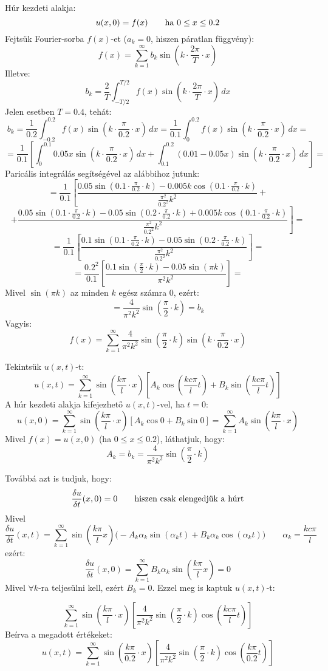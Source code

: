 \documentclass[12pt]{article}
\begin{document}
Húr kezdeti alakja:
\[u(x, 0) = f(x) \qquad \hbox{ha $0 \leq x \leq 0.2$}\]
Fejtsük Fourier-sorba $f(x)$-et ($a_k = 0$, hiszen páratlan függvény):
\[f(x) = \sum_{k=1}^{\infty} b_k \sin\left(k\cdot\frac{2\pi}{T}\cdot x\right)\]
Illetve:
\[b_k = \frac{2}{T} \int_{-T/2}^{T/2} f(x) \sin\left(k\cdot\frac{2\pi}{T}\cdot x\right)\, dx\]
Jelen esetben $T=0.4$, tehát:
\[b_k = \frac{1}{0.2} \int_{-0.2}^{0.2} f(x) \sin\left(k\cdot\frac{\pi}{0.2}\cdot x\right)\, dx = \frac{1}{0.1} \int_{0}^{0.2} f(x) \sin\left(k\cdot\frac{\pi}{0.2}\cdot x\right)\, dx =\]
\[= \frac{1}{0.1} \left[ \int_{0}^{0.1} 0.05x \sin\left(k\cdot\frac{\pi}{0.2}\cdot x\right)\, dx + \int_{0.1}^{0.2} (0.01-0.05x) \sin\left(k\cdot\frac{\pi}{0.2}\cdot x\right)\, dx \right] = \]
Paricális integrálás segítségével az alábbihoz jutunk:
\[ = \frac{1}{0.1} \left[ \frac{0.05 \sin\left(0.1\cdot\frac{\pi}{0.2}\cdot k\right)- 0.005 k \cos\left(0.1\cdot\frac{\pi}{0.2}\cdot k\right)}{\frac{\pi^2}{0.2^2}k^2} + \right.\]
\[\left. + \frac{0.05\sin\left(0.1\cdot\frac{\pi}{0.2}\cdot k\right)-0.05\sin\left(0.2\cdot\frac{\pi}{0.2}\cdot k\right)+0.005 k \cos\left(0.1\cdot\frac{\pi}{0.2}\cdot k\right)}{\frac{\pi^2}{0.2^2} k^2} \right] = \]
\[= \frac{1}{0.1} \left[ \frac{0.1 \sin\left(0.1\cdot\frac{\pi}{0.2}\cdot k\right) -0.05\sin\left(0.2\cdot\frac{\pi}{0.2}\cdot k\right)}{\frac{\pi^2}{0.2^2} k^2} \right] = \]
\[= \frac{0.2^2}{0.1} \left[ \frac{0.1 \sin\left(\frac{\pi}{2}\cdot k\right) -0.05\sin\left(\pi k\right)}{\pi^2 k^2} \right] = \]
Mivel $\sin(\pi k)$ az minden $k$ egész számra 0, ezért:
\[= \boxed{\frac{4}{\pi^2 k^2} \sin\left(\frac{\pi}{2}\cdot k\right) = b_k}\]
Vagyis:
\[f(x) = \sum_{k=1}^{\infty} \frac{4}{\pi^2 k^2} \sin\left(\frac{\pi}{2}\cdot k\right) \sin\left(k\cdot\frac{\pi}{0.2}\cdot x\right)\]

Tekintsük $u(x,t)$-t:
\[u(x,t) = \sum_{k=1}^\infty \sin\left(\frac{k\pi}{l}\cdot x\right)\left[ A_k \cos\left(\frac{kc\pi}{l}t\right) + B_k \sin\left(\frac{kc\pi}{l}t\right) \right]\]
A húr kezdeti alakja kifejezhető $u(x,t)$-vel, ha $t = 0$:
\[u(x,0) = \sum_{k=1}^\infty \sin\left(\frac{k\pi}{l}\cdot x\right)\left[ A_k \cos0 + B_k \sin0 \right] = \sum_{k=1}^\infty A_k\sin\left(\frac{k\pi}{l}\cdot x\right)\]
Mivel $f(x) = u(x, 0)$ (ha $0\leq x\leq 0.2$), láthatjuk, hogy:
\[A_k = b_k = \frac{4}{\pi^2 k^2} \sin\left(\frac{\pi}{2}\cdot k\right)\]

Továbbá azt is tudjuk, hogy:
\[\frac{\delta u}{\delta t}(x, 0) = 0 \qquad \hbox{hiszen csak elengedjük a húrt}\]
Mivel
\[\frac{\delta u}{\delta t}(x, t) = \sum_{k=1}^\infty \sin \left(\frac{k\pi}{l}x\right)\Big(-A_k\alpha_k\sin(\alpha_k t)+B_k\alpha_k\cos(\alpha_k t)\Big) \qquad \alpha_k = \frac{kc\pi}{l}\]
ezért:
\[\frac{\delta u}{\delta t}(x, 0) = \sum_{k=1}^\infty B_k\alpha_k\sin \left(\frac{k\pi}{l}x\right) = 0\]
Mivel $\forall k$-ra teljesülni kell, ezért $B_k = 0$. Ezzel meg is kaptuk $u(x, t)$-t:

\[\boxed{\sum_{k=1}^\infty \sin\left(\frac{k\pi}{l}\cdot x\right)\left[ \frac{4}{\pi^2 k^2} \sin\left(\frac{\pi}{2}\cdot k\right) \cos\left(\frac{kc\pi}{l}t\right) \right]}\]
Beírva a megadott értékeket:
\[\boxed{u(x, t) = \sum_{k=1}^\infty \sin\left(\frac{k\pi}{0.2}\cdot x\right)\left[ \frac{4}{\pi^2 k^2} \sin\left(\frac{\pi}{2}\cdot k\right) \cos\left(\frac{k\pi}{0.2}t\right) \right]}\]
\end{document}
